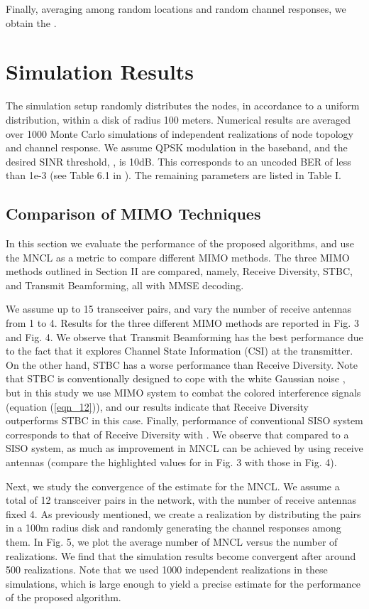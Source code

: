 \documentclass[draftcls,onecolumn,peerview,12pt]{IEEEtran}
\begin{document}
Finally, averaging  among random locations and random
channel responses, we obtain the .

\section{Simulation Results}
The simulation setup randomly distributes the nodes, in accordance
to a uniform distribution, within a disk of radius 100 meters.
Numerical results are averaged over 1000 Monte Carlo simulations of
independent realizations of node topology and channel response. We
assume QPSK modulation in the baseband, and the desired SINR
threshold, , is 10dB. This corresponds to an uncoded BER
of less than 1e-3 (see Table 6.1 in \cite{14_Wireless_Comm}). The
remaining parameters are listed in Table I.

\subsection{Comparison of MIMO Techniques}
In this section we evaluate the performance of the proposed
algorithms, and use the MNCL as a metric to compare different MIMO
methods. The three MIMO methods outlined in Section II are compared,
namely,  Receive Diversity,  STBC, and  Transmit Beamforming, all with MMSE decoding.

We assume up to 15 transceiver pairs, and vary the number of receive
antennas from 1 to 4. Results for the three different MIMO methods
are reported in Fig. 3 and Fig. 4. We observe that Transmit
Beamforming has the best performance due to the fact that it
explores Channel State Information (CSI) at the transmitter. On the
other hand, STBC has a worse performance than Receive Diversity.
Note that STBC is conventionally designed to cope with the white
Gaussian noise \cite{17_alamouti}, but in this study we use MIMO
system to combat the colored interference signals (equation
(\ref{eqn_12})), and our results indicate that Receive Diversity
outperforms STBC in this case. Finally, performance of conventional
SISO system corresponds to that of Receive Diversity with . We
observe that compared to a SISO system, as much as 
improvement in MNCL can be achieved by using  receive antennas
(compare the highlighted values for  in Fig. 3 with
those in Fig. 4).

Next, we study the convergence of the estimate for the MNCL. We
assume a total of 12 transceiver pairs in the network, with the
number of receive antennas fixed 4. As previously mentioned, we
create a realization by distributing the pairs in a 100m radius disk
and randomly generating the channel responses among them. In Fig. 5,
we plot the average number of MNCL versus the number of
realizations. We find that the simulation results become convergent
after around 500 realizations. Note that we used 1000 independent
realizations in these simulations, which is large enough to yield a
precise estimate for the performance of the proposed algorithm.
\end{document}
